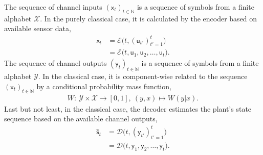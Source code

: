 \documentclass[conference]{IEEEtran}
\newcommand{\rx}{\mathsf{x}}
\newcommand{\ry}{\mathsf{y}}
\newcommand{\rs}{\mathsf{s}}
\newcommand{\ru}{\mathsf{u}}
\def\E{{\mathcal E}}
\def\D{{\mathcal D}}
\def\X{{\mathcal X}}
\def\Y{{\mathcal Y}}
\def\NN{{\mathbb N}}
\begin{document}
	The sequence of channel inputs \((\rx_t)_{t\in\NN}\) is a sequence
	of symbols from a finite alphabet \(\X\). In the purely classical case, it is calculated by the encoder based on available sensor data,
	\begin{align}	\rx_t   &= \E \big(t, (\ru_{t'})_{t'=1}^{t}\big) \nonumber\\
							&= \E\big(t, \ru_1,\ru_2,\ldots,\ru_t\big).
	\end{align} 
	The sequence of channel outputs \((\ry_t)_{t\in\NN}\) is a sequence
	of symbols from a finite alphabet \(\Y\). In the classical case, it is component-wise related to the sequence \((\rx_t)_{t\in\NN}\) by a conditional probability mass function,
	\begin{align}   \label{eq:CndPrbMass}
					W :~ \Y \times \X \rightarrow [0,1],~(y,x) \mapsto W(y|x).
	\end{align}
	Last but not least, in the classical case, the decoder estimates the plant's state sequence based on the available channel outputs,
	\begin{align}	\hat{\rs}_t  	&= \D \big(t, (\ry_{t'})_{t'=1}^{t}\big) \nonumber\\ 
									&= \D\big(t,\ry_1,\ry_2,\ldots,\ry_t\big).
	\end{align}
\end{document}
